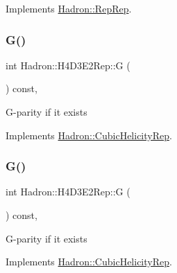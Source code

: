 Implements \mbox{\hyperlink{structHadron_1_1RepRep_a92c8802e5ed7afd7da43ccfd5b7cd92b}{Hadron\+::\+Rep\+Rep}}.

\mbox{\label{structHadron_1_1H4D3E2Rep_a2fb62d571edaca91fd4f1f7f6ada2fbd}} 
\subsubsection{\texorpdfstring{G()}{G()}\hspace{0.1cm}{\footnotesize\ttfamily [1/3]}}
{\footnotesize\ttfamily int Hadron\+::\+H4\+D3\+E2\+Rep\+::G (\begin{DoxyParamCaption}{ }\end{DoxyParamCaption}) const\hspace{0.3cm}{\ttfamily [inline]}, {\ttfamily [virtual]}}

G-\/parity if it exists 

Implements \mbox{\hyperlink{structHadron_1_1CubicHelicityRep_a50689f42be1e6170aa8cf6ad0597018b}{Hadron\+::\+Cubic\+Helicity\+Rep}}.

\mbox{\label{structHadron_1_1H4D3E2Rep_a2fb62d571edaca91fd4f1f7f6ada2fbd}} 
\subsubsection{\texorpdfstring{G()}{G()}\hspace{0.1cm}{\footnotesize\ttfamily [2/3]}}
{\footnotesize\ttfamily int Hadron\+::\+H4\+D3\+E2\+Rep\+::G (\begin{DoxyParamCaption}{ }\end{DoxyParamCaption}) const\hspace{0.3cm}{\ttfamily [inline]}, {\ttfamily [virtual]}}

G-\/parity if it exists 

Implements \mbox{\hyperlink{structHadron_1_1CubicHelicityRep_a50689f42be1e6170aa8cf6ad0597018b}{Hadron\+::\+Cubic\+Helicity\+Rep}}.

\mbox{\label{structHadron_1_1H4D3E2Rep_a2fb62d571edaca91fd4f1f7f6ada2fbd}} 
